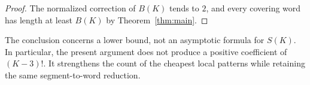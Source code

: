 \begin{proof}
The normalized correction of $B(K)$ tends to $2$, and every covering
word has length at least $B(K)$ by Theorem~\ref{thm:main}.
\end{proof}

The conclusion concerns a lower bound, not an asymptotic formula for
$S(K)$. In particular, the present argument does not produce a positive
coefficient of $(K-3)!$. It strengthens the count of the cheapest local
patterns while retaining the same segment-to-word reduction.
